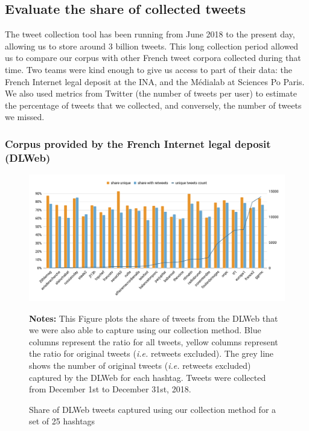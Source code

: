 \subsection{Evaluate the share of collected tweets}
\label{Evaluate the share}
The tweet collection tool has been running from June 2018 to the present day, allowing us to store around 3 billion tweets. This long collection period allowed us to compare our corpus with other French tweet corpora collected during that time. Two teams were kind enough to give us access to part of their data: the French Internet legal deposit at the INA, and the Médialab at Sciences Po Paris. We also used metrics from Twitter (the number of tweets per user) to estimate the percentage of tweets that we collected, and conversely, the number of tweets we missed.

\subsubsection{Corpus provided by the French Internet legal deposit (DLWeb)}
\begin{figure}
\begin{center}
\includegraphics[width=1\textwidth]{figures/ShareinCommonWithDL.pdf}
\end{center}
\scriptsize \textbf{Notes:} This Figure plots the share of tweets from the DLWeb that we were also able to capture using our collection method. Blue columns represent the ratio for all tweets, yellow columns represent the ratio for original tweets (\textit{i.e.} retweets excluded). The grey line shows the number of original tweets (\textit{i.e.} retweets excluded) captured by the DLWeb for each hashtag. Tweets were collected from December 1st to December 31st, 2018.

\caption{Share of DLWeb tweets captured using our collection method for a set of 25 hashtags}
\label{Figure:HistogramHashtagsDLWeb}
\end{figure}

